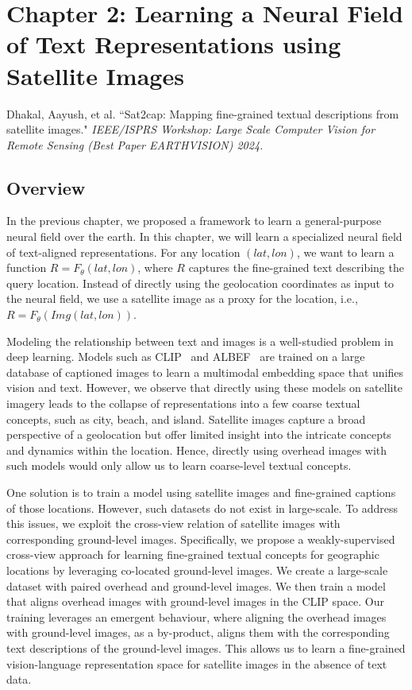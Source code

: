 \section{Chapter 2: Learning a Neural Field of Text Representations using Satellite Images}
\label{sec:sat2cap}
Dhakal, Aayush, et al. ``Sat2cap: Mapping fine-grained textual descriptions from satellite images." \textit{IEEE/ISPRS Workshop: Large Scale Computer Vision for Remote Sensing (Best Paper EARTHVISION) 2024.}
\subsection{Overview}
In the previous chapter, we proposed a framework to learn a general-purpose neural field over the earth. In this chapter, we will learn a specialized neural field of text-aligned representations. For any location $(lat,lon)$, we want to learn a function $R= F_\theta(lat,lon)$, where $R$ captures the fine-grained text describing the query location. Instead of directly using the geolocation coordinates as input to the neural field, we use a satellite image as a proxy for the location, i.e., $ R = F_\theta(Img(lat, lon))$.

Modeling the relationship between text and images is a well-studied problem in deep learning. Models such as CLIP~\cite{radford2021learning} and ALBEF~\cite{li2021align} are trained on a large database of captioned images to learn a multimodal embedding space that unifies vision and text. However, we observe that directly using these models on satellite imagery leads to the collapse of representations into a few coarse textual concepts, such as city, beach, and island. Satellite images capture a broad perspective of a geolocation but offer limited insight
into the intricate concepts and dynamics within the location. Hence, directly using overhead images with such models would only allow us to learn coarse-level textual concepts.

One solution is to train a model using satellite images and fine-grained captions of those locations. However, such datasets do not exist in large-scale. To address this issues, we exploit the cross-view relation of satellite images with corresponding ground-level images. Specifically, we propose a weakly-supervised
cross-view approach for learning fine-grained textual concepts for geographic locations by leveraging co-located ground-level images. We create a large-scale dataset with paired overhead and ground-level images. We then train a model that aligns overhead images with ground-level images in the CLIP space. Our training leverages an emergent behaviour, where aligning the overhead images with ground-level images, as a by-product, aligns them with the corresponding text descriptions of the ground-level images. This allows us to learn a fine-grained vision-language representation space for satellite images in the absence of text data.  

